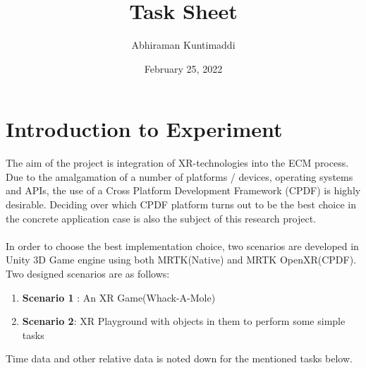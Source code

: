 \documentclass{article}
\title{\textbf{Task Sheet}}
\author{Abhiraman Kuntimaddi}
\date{February 25, 2022}
\begin{document}
\maketitle

\section*{Introduction to Experiment}
The aim of the project is integration of XR-technologies into the ECM process.
Due to the amalgamation of a number of platforms / devices, operating systems and APIs,
the use of a Cross Platform Development Framework (CPDF) is highly desirable. Deciding over
which CPDF platform turns out to be the best choice in the concrete application case is also the subject of this research project.\\~\\
In order to choose the best implementation choice, two scenarios are developed in Unity 3D Game engine using both MRTK(Native) and MRTK OpenXR(CPDF).
Two designed scenarios are as follows:
\begin{enumerate}
	\item \textbf{Scenario 1} : An XR Game(Whack-A-Mole)
	\item \textbf{Scenario 2}: XR Playground with objects in them to perform some simple tasks

\end{enumerate}

Time data and other relative data is noted down for the mentioned tasks below.
\end{document}
